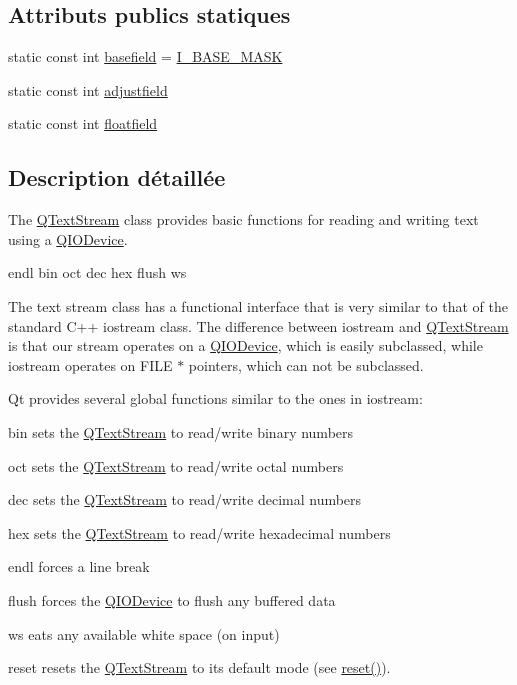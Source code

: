 \subsection*{Attributs publics statiques}
\begin{DoxyCompactItemize}
\item 
static const int \hyperlink{class_q_text_stream_af3f86710e9a559feb59d4b5e08017bed}{basefield} = \hyperlink{qtextstream_8cpp_a813392cc8b6b68aa3fbaf4862efe4d0c}{I\+\_\+\+B\+A\+S\+E\+\_\+\+M\+A\+S\+K}
\item 
static const int \hyperlink{class_q_text_stream_a22f60cd97e89709d1f32e9d2555d85a9}{adjustfield}
\item 
static const int \hyperlink{class_q_text_stream_a01b7c551fcbc8389b7dffa2348a57066}{floatfield}
\end{DoxyCompactItemize}


\subsection{Description détaillée}
The \hyperlink{class_q_text_stream}{Q\+Text\+Stream} class provides basic functions for reading and writing text using a \hyperlink{class_q_i_o_device}{Q\+I\+O\+Device}. 

endl  bin  oct  dec  hex  flush  ws

The text stream class has a functional interface that is very similar to that of the standard C++ iostream class. The difference between iostream and \hyperlink{class_q_text_stream}{Q\+Text\+Stream} is that our stream operates on a \hyperlink{class_q_i_o_device}{Q\+I\+O\+Device}, which is easily subclassed, while iostream operates on F\+I\+L\+E $\ast$ pointers, which can not be subclassed.

Qt provides several global functions similar to the ones in iostream\+: 
\begin{DoxyItemize}
\item {\ttfamily bin} sets the \hyperlink{class_q_text_stream}{Q\+Text\+Stream} to read/write binary numbers 
\item {\ttfamily oct} sets the \hyperlink{class_q_text_stream}{Q\+Text\+Stream} to read/write octal numbers 
\item {\ttfamily dec} sets the \hyperlink{class_q_text_stream}{Q\+Text\+Stream} to read/write decimal numbers 
\item {\ttfamily hex} sets the \hyperlink{class_q_text_stream}{Q\+Text\+Stream} to read/write hexadecimal numbers 
\item {\ttfamily endl} forces a line break 
\item {\ttfamily flush} forces the \hyperlink{class_q_i_o_device}{Q\+I\+O\+Device} to flush any buffered data 
\item {\ttfamily ws} eats any available white space (on input) 
\item {\ttfamily reset} resets the \hyperlink{class_q_text_stream}{Q\+Text\+Stream} to its default mode (see \hyperlink{class_q_text_stream_ac92d855fc3fa8b5d1c7421e2a0654a83}{reset()}). 
\end{DoxyItemize}

